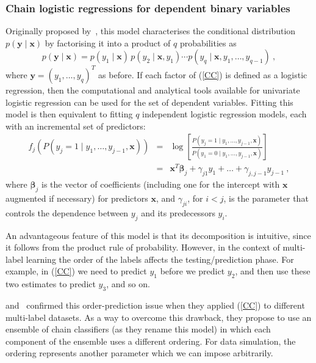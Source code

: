 \documentclass[review]{elsarticle}
\begin{document}
	\subsubsection{Chain logistic regressions for dependent binary variables}
	
	Originally proposed by~\citet{CHAIN}, this model characterises the conditional distribution $p(\mathbf{y}\mid\mathbf{x})$ by factorising it into a product of $q$ probabilities as
	\begin{equation} \label{CC}
	p(\mathbf{y}\mid\mathbf{x}) = p(y_{1}\mid\mathbf{x})\, p(y_{2}\mid\mathbf{x}, y_{1}) \cdots p(y_{q}\mid\mathbf{x}, y_{1},\ldots, y_{q-1})\ ,
	\end{equation}
	where $\mathbf{y}=\left(y_{1},\ldots,y_{q} \right)^T$ as before.
	If each factor of (\ref{CC}) is defined as a logistic regression, then the computational and analytical tools available for univariate logistic regression can be used for the set of dependent variables. Fitting this model is then equivalent to fitting $q$ independent logistic regression models, each with an incremental set of predictors:
	\begin{eqnarray}
	f_{j} \left( P(y_{j} = 1 \mid y_{1},\ldots,y_{j-1},\mathbf{x}) \right) &=& \log \left[ \frac{P(y_{j} = 1\mid y_{1},\ldots,y_{j-1},\mathbf{x})}{P(y_{1} = 0\mid y_{1},\ldots,y_{j-1},\mathbf{x})} \right] \nonumber\\
	&=& \mathbf{x}^T \bm{\beta}_j + \gamma_{j1} y_{1} + \ldots + \gamma_{j,j-1} y_{j-1}\ ,
	\label{eq:cc}
	\end{eqnarray}
	where $\bm{\beta}_{j}$ is the vector of coefficients (including one for the intercept with $\mathbf{x}$ augmented if necessary) for predictors $\mathbf{x}$, and $\gamma_{ji}$, for $i<j$, is the parameter that controls the dependence between $y_{j}$ and its predecessors $y_{i}$. 
	
	An advantageous feature of this model is that its decomposition is intuitive, since it follows from the product rule of probability. However, in the context of multi-label learning the order of the labels affects the testing/prediction phase. For example, in (\ref{CC}) we need to predict $y_{1}$ before we predict $y_{2}$, and then use these two estimates to predict $y_{3}$, and so on.
	
	\citet{OCC} and~\citet{PCC} confirmed this order-prediction issue when they applied (\ref{CC}) to different multi-label datasets. As a way to overcome this drawback, they propose to use an ensemble of chain classifiers (as they rename this model) in which each component of the ensemble uses a different ordering. For data simulation, the ordering represents another parameter which we can impose arbitrarily.
	
\end{document}
